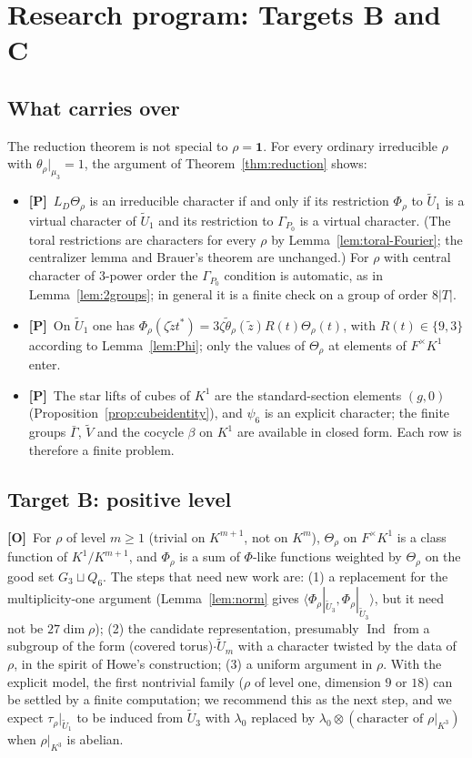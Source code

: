 \documentclass[11pt]{article}
\newcommand{\Ind}{\operatorname{Ind}}
\newcommand{\tU}{\widetilde U}
\newcommand{\tV}{\widetilde V}
\newcommand{\tth}{\widetilde\theta}
\newcommand{\Ptag}{\textnormal{\textbf{[P]}}}
\newcommand{\Otag}{\textnormal{\textbf{[O]}}}
\theoremstyle{plain}
\theoremstyle{definition}
\begin{document}
\section{Research program: Targets B and C}\label{sec:plan}
\subsection{What carries over}
The reduction theorem is not special to $\rho=\mathbf1$.  For every
ordinary irreducible $\rho$ with $\theta_\rho|_{\mu_3}=1$, the
argument of Theorem~\ref{thm:reduction} shows:
\begin{itemize}
\item \Ptag\ $L_D\Theta_\rho$ is an irreducible character if and only if its
restriction $\Phi_\rho$ to $\tU_1$ is a virtual character of $\tU_1$
and its restriction to $\Gamma_{P_0}$ is a virtual character.  (The
toral restrictions are characters for every $\rho$ by
Lemma~\ref{lem:toral-Fourier}; the centralizer lemma and Brauer's
theorem are unchanged.)  For $\rho$ with central character of $3$-power
order the $\Gamma_{P_0}$ condition is automatic, as in
Lemma~\ref{lem:2groups}; in general it is a finite check on a group of
order $8|T|$.
\item \Ptag\ On $\tU_1$ one has $\Phi_\rho(\zeta\tilde zt^*)=3\zeta\tth_\rho(\tilde z)R(t)\Theta_\rho(t)$,
with $R(t)\in\{9,3\}$ according to Lemma~\ref{lem:Phi}; only the values
of $\Theta_\rho$ at elements of $F^\times K^1$ enter.
\item \Ptag\ The star lifts of cubes of $K^1$ are the standard-section
elements $(g,0)$ (Proposition~\ref{prop:cubeidentity}), and $\psi_6$ is
an explicit character; the finite groups $\bar\Gamma$, $\tV$ and the
cocycle $\beta$ on $K^1$ are available in closed form.  Each row is
therefore a finite problem.
\end{itemize}
\subsection{Target B: positive level}\label{subsec:targetB}
\Otag\ For $\rho$ of level $m\ge1$ (trivial on $K^{m+1}$, not on $K^m$),
$\Theta_\rho$ on $F^\times K^1$ is a class function of $K^1/K^{m+1}$, and
$\Phi_\rho$ is a sum of $\Phi$-like functions weighted by
$\Theta_\rho$ on the good set $G_3\sqcup Q_6$.  The steps that need
new work are: (1) a replacement for the multiplicity-one argument
(Lemma~\ref{lem:norm} gives $\langle\Phi_\rho|_{\tU_3},\Phi_\rho|_{\tU_3}\rangle$,
but it need not be $27\dim\rho$); (2) the candidate representation,
presumably $\Ind$ from a subgroup of the form
(covered torus)$\cdot\tU_m$ with a character twisted by the data of
$\rho$, in the spirit of Howe's construction; (3) a uniform argument
in $\rho$.  With the explicit model, the first nontrivial family
($\rho$ of level one, dimension $9$ or $18$) can be settled by a finite
computation; we recommend this as the next step, and we expect
$\tau_\rho|_{\tU_1}$ to be induced from $\tU_3$ with $\lambda_0$ replaced by
$\lambda_0\otimes(\text{character of }\rho|_{K^3})$ when $\rho|_{K^3}$ is
abelian.
\end{document}
